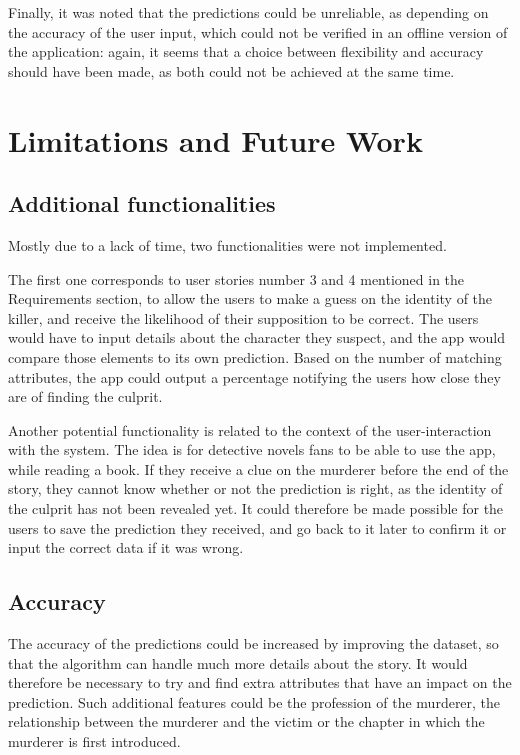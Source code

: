 \documentclass{mproj}
\begin{document}
Finally, it was noted that the predictions could be unreliable, as depending on the accuracy of the user input, which could not be verified in an offline version of the application: again, it seems that a choice between flexibility and accuracy should have been made, as both could not be achieved at the same time.

\section{Limitations and Future Work}

\subsection*{Additional functionalities}

Mostly due to a lack of time, two functionalities were not implemented.\par

The first one corresponds to user stories number 3 and 4 mentioned in the Requirements section, to allow the users to make a guess on the identity of the killer, and receive the likelihood of their supposition to be correct. The users would have to input details about the character they suspect, and the app would compare those elements to its own prediction. Based on the number of matching attributes, the app could output a percentage notifying the users how close they are of finding the culprit. \par

Another potential functionality is related to the context of the user-interaction with the system. The idea is for detective novels fans to be able to use the app, while reading a book. If they receive a clue on the murderer before the end of the story, they cannot know whether or not the prediction is right, as the identity of the culprit has not been revealed yet. It could therefore be made possible for the users to save the prediction they received, and go back to it later to confirm it or input the correct data if it was wrong.

\subsection*{Accuracy}

The accuracy of the predictions could be increased by improving the dataset, so that the algorithm can handle much more details about the story. It would therefore be necessary to try and find extra attributes that have an impact on the prediction. Such additional features could be the profession of the murderer, the relationship between the murderer and the victim or the chapter in which the murderer is first introduced. \par
\end{document}
